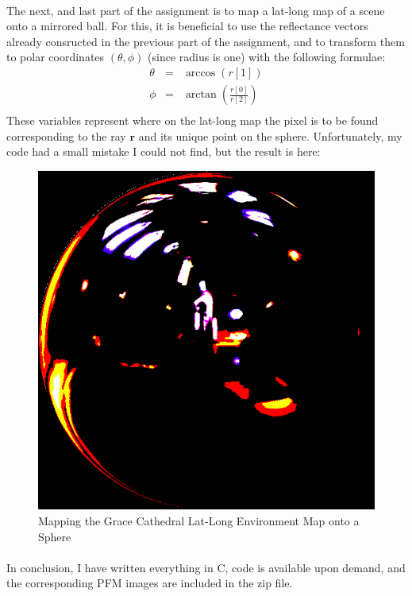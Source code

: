 \documentclass[a4paper,12pt,oneside,final]{report}
\newenvironment{changemargin}[2]{\begin{list}{}{%
\setlength{\topsep}{0pt}%
\setlength{\leftmargin}{0pt}%
\setlength{\rightmargin}{0pt}%
\setlength{\listparindent}{\parindent}%
\setlength{\itemindent}{\parindent}%
\setlength{\parsep}{0pt plus 1pt}%
\addtolength{\leftmargin}{#1}%
\addtolength{\rightmargin}{#2}%
}\item }{\end{list}}
\begin{document}
\paragraph{}
The next, and last part of the assignment is to map a lat-long map of a scene onto a mirrored ball.  For this, it is beneficial to use the reflectance vectors already consructed in the previous part of the assignment, and to transform them to polar coordinates $(\theta, \phi)$ (since radius is one) with the following formulae:
\begin{eqnarray}
\theta &=& \arccos(r[1]) \\
\phi &=& \arctan\left(\frac{r[0]}{r[2]}\right)\\
\end{eqnarray}
These variables represent where on the lat-long map the pixel is to be found corresponding to the ray $\mathbf{r}$ and its unique point on the sphere.  Unfortunately, my code had a small mistake I could not find, but the result is here:
\begin{figure}[!h]
\begin{changemargin}{-50mm}{-50mm}
\center
\includegraphics[scale=0.4]{grace_sphere.png}
\caption{Mapping the Grace Cathedral Lat-Long Environment Map onto a Sphere}
\end{changemargin}
\end{figure}


\paragraph{}
In conclusion, I have written everything in C, code is available upon demand, and the corresponding PFM images are included in the zip file.
\end{document}
